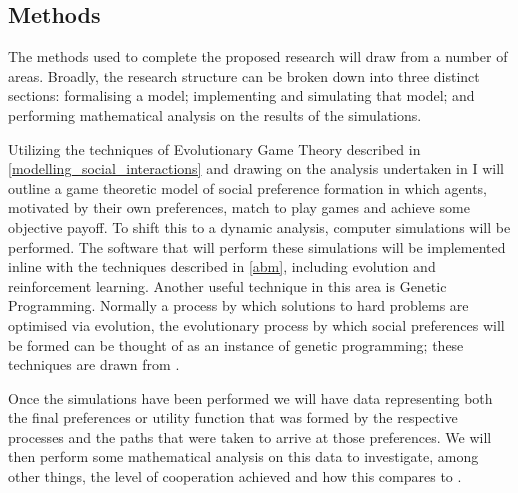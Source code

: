 \documentclass[11pt]{article}
\newcommand*{\np}{\par\noindent\newline}
\begin{document}
\subsection{Methods}
The methods used to complete the proposed research will draw from a number of
areas. Broadly, the research structure can be broken down into three distinct
sections: formalising a model; implementing and simulating that model; and
performing mathematical analysis on the results of the simulations.
\np Utilizing the techniques of Evolutionary Game Theory described in
\ref{modelling_social_interactions} and drawing on the analysis undertaken in
\cite{alger_homo_2013} I will outline a game theoretic model of social
preference formation in which agents, motivated by their own preferences, match
to play games and achieve some objective payoff. To shift this to a dynamic
analysis, computer simulations will be performed. The software that will
perform these simulations will be implemented inline with the techniques
described in \ref{abm}, including evolution and reinforcement learning. Another
useful technique in this area is Genetic Programming. Normally a process by
which solutions to hard problems are optimised via evolution, the evolutionary
process by which social preferences will be formed can be thought of as an
instance of genetic programming; these techniques are drawn from
\cite{poli_field_2008}.
\np Once the simulations have been performed we will have data representing
both the final preferences or utility function that was formed by the
respective processes and the paths that were taken to arrive at those
preferences. We will then perform some mathematical analysis on this data to
investigate, among other things, the level of cooperation achieved and how this compares to \cite{alger_homo_2013}.
\end{document}
